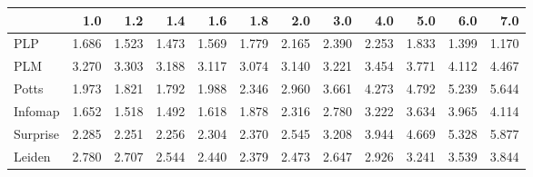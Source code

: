 \begin{tabular}{lrrrrrrrrrrr}
\toprule
{} &   1.0 &   1.2 &   1.4 &   1.6 &   1.8 &   2.0 &   3.0 &   4.0 &   5.0 &   6.0 &   7.0 \\
\midrule
PLP      & 1.686 & 1.523 & 1.473 & 1.569 & 1.779 & 2.165 & 2.390 & 2.253 & 1.833 & 1.399 & 1.170 \\
PLM      & 3.270 & 3.303 & 3.188 & 3.117 & 3.074 & 3.140 & 3.221 & 3.454 & 3.771 & 4.112 & 4.467 \\
Potts    & 1.973 & 1.821 & 1.792 & 1.988 & 2.346 & 2.960 & 3.661 & 4.273 & 4.792 & 5.239 & 5.644 \\
Infomap  & 1.652 & 1.518 & 1.492 & 1.618 & 1.878 & 2.316 & 2.780 & 3.222 & 3.634 & 3.965 & 4.114 \\
Surprise & 2.285 & 2.251 & 2.256 & 2.304 & 2.370 & 2.545 & 3.208 & 3.944 & 4.669 & 5.328 & 5.877 \\
Leiden   & 2.780 & 2.707 & 2.544 & 2.440 & 2.379 & 2.473 & 2.647 & 2.926 & 3.241 & 3.539 & 3.844 \\
\bottomrule
\end{tabular}
